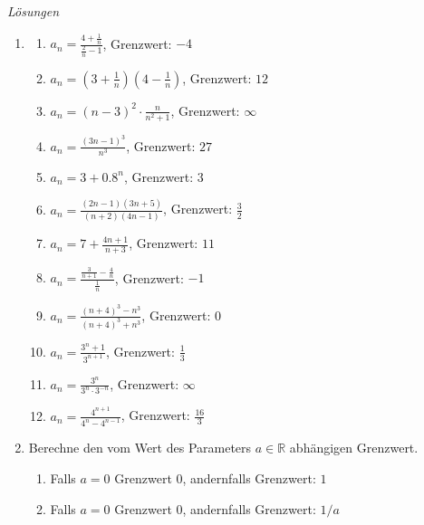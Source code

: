\clearpage
\emph{Lösungen}
\begin{enumerate}
	\item \begin{enumerate}
		      \item $a_n = \frac{4 + \frac{1}{n}}{ \frac{2}{n}-1}$, \quad Grenzwert: $-4$
		      \item $a_n = \left(3 + \frac{1}{n}\right)(4 - \frac{1}{n})$, \quad Grenzwert: $12$
		      \item $a_n = (n - 3)^2 \cdot\frac{ n}{n^2 + 1}$, \quad Grenzwert: $\infty$
		      \item $a_n = \frac{(3n - 1)^3}{n^3}$, \quad Grenzwert: $27$
		      \item $a_n = 3 + 0.8^n$, \quad Grenzwert: $3$
		      \item $a_n = \frac{(2n - 1)(3n + 5)}{(n + 2)(4n - 1)}$, \quad Grenzwert: $\frac{3}{2} $
		      \item $a_n = 7 + \frac{4n + 1}{n + 3}$, \quad Grenzwert: $11$
		      \item $a_n = \frac{\frac{3}{n+1} - \frac{4}{n}}{\frac{1}{n}}$, \quad Grenzwert: $-1$
		      \item $a_n = \frac{(n + 4)^3 - n^3}{(n + 4)^3 + n^3}$, \quad Grenzwert: $0$
		      \item $a_n = \frac{3^n + 1}{3^{n+1}}$, \quad Grenzwert: $\frac{1}{3}$
		      \item $a_n = \frac{3^n}{3^n \cdot 3^{-n}}$, \quad Grenzwert: $\infty$
		      \item $a_n = \frac{4^{n+1}}{4^n - 4^{n-1}}$, \quad Grenzwert: $\frac{16}{3}$
	      \end{enumerate}

	\item

	      Berechne den vom Wert des Parameters $a \in \mathbb{R}$ abhängigen Grenzwert.

	      \begin{enumerate}
		      \item Falls $a=0$ Grenzwert $0$, andernfalls Grenzwert: $1$
		      \item Falls $a=0$ Grenzwert $0$, andernfalls Grenzwert: $1/a$
	      \end{enumerate}
\end{enumerate}















